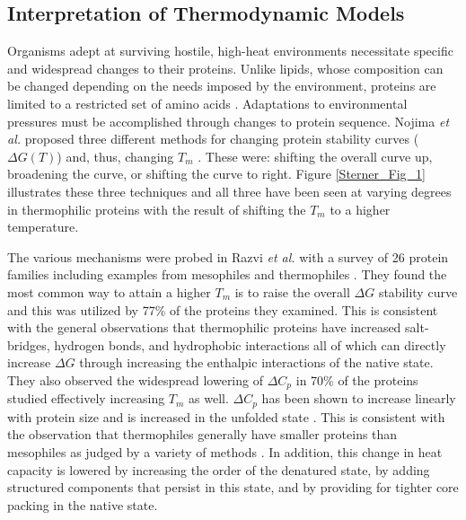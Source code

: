 
\subsection{Interpretation of Thermodynamic Models}

Organisms adept at surviving hostile, high-heat environments necessitate
specific and widespread changes to their proteins.  Unlike lipids, whose
composition can be changed depending on the needs imposed by the environment,
proteins are limited to a restricted set of amino acids
\cite{Razvi_ref_Russell_1990}.  Adaptations to environmental pressures must be
accomplished through changes to protein sequence. Nojima \emph{et al.} proposed
three different methods for changing protein stability curves ($\Delta G \left
(  T \right )$) and, thus, changing ${T}_{m}$ \cite{Razvi_Nojima_1977}.  These
were: shifting the overall curve up, broadening the curve, or shifting the
curve to right.  Figure \ref{Sterner_Fig_1} illustrates these three techniques 
and all three have been seen at varying degrees in thermophilic proteins
with the result of shifting the ${T }_{m }$ to a higher temperature.  

The various mechanisms were probed in Razvi \emph{et al.} with a survey of 26
protein families including examples from mesophiles and thermophiles
\cite{razvi2006lst}.  They found the most common way to attain a higher ${T
}_{m }$ is to raise the overall $\Delta G$ stability curve and this was
utilized by 77\% of the proteins they examined.  This is consistent with the
general observations that thermophilic proteins have increased salt-bridges,
hydrogen bonds, and hydrophobic interactions all of which can directly increase
$\Delta G$ through increasing the enthalpic interactions of the native state.
They also observed the widespread lowering of $\Delta  {C }_{p }$ in 70\% of
the proteins studied effectively increasing ${T }_{m }$ as well.  $\Delta {C
}_{p }$ has been shown to increase linearly with protein size and is increased
in the unfolded state \cite{myers1995dmv}. This is consistent with the
observation that thermophiles generally have smaller proteins than mesophiles
as judged by a variety of methods \cite{chakravarty2002efr}.  In addition, this
change in heat capacity is lowered by increasing the order of the denatured
state, by adding structured components that persist in this state, and by
providing for tighter core packing in the native state.

